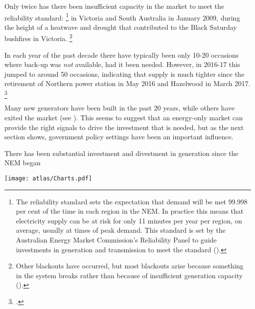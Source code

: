 \documentclass[FrontPage]{grattan}
\begin{document}
Only twice has there been insufficient capacity in the market to meet the reliability standard:%
\footnote{The reliability standard sets the expectation that demand will be met 99.998 per cent of the time in each region in the NEM\@. In practice this means that electricity supply can be at risk for only 11 minutes per year per region, on average, usually at times of peak demand. This standard is set by the Australian Energy Market Commission's Reliability Panel to guide investments in generation and transmission to meet the standard (\textcite{AEMC2017ReliabilityStandardReview}).}
in Victoria and South Australia in January 2009, during the height of a heatwave and drought that contributed to the Black Saturday bushfires in Victoria.%
\footnote{Other blackouts have occurred, but most blackouts arise because something in the system breaks rather than because of insufficient generation capacity (\textcite{AEMO2017FinkelSubmission}).}


In each year of the past decade there have typically been only 10-20 occasions where back-up was \emph{not} available, had it been needed.
However, in 2016-17 this jumped to around 50 occasions, indicating that supply is much tighter since the retirement of Northern power station in May 2016 and Hazelwood in March 2017.%
\footcite{AEMC2017ReliabilityFrameworksIssuesPaper}

Many new generators have been built in the past 20 years, while others have exited the market (see ). This seems to suggest that an energy-only market can provide the right signals to drive the investment that is needed, but as the next section shows, government policy settings have been an important influence.

\begin{figureTop}
\caption{There has been substantial investment and divestment in generation since the NEM began}\label{fig:substantial-investment-and-divestment-in-generation-over-time}
\texttt{[image: atlas/Charts.pdf]}
\end{figureTop}
\end{document}
